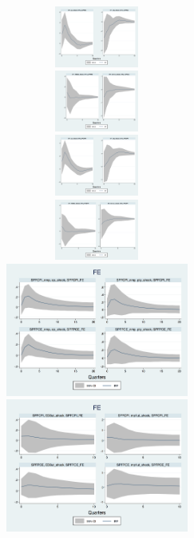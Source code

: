 \documentclass[]{article}
\begin{document}
\begin{figure}[h]\label{ReplicateCoibionpost2007}
	\centering
	\includegraphics[width=6cm,height=2cm]{figures/CPIAU_ashocks_nmp_post2007.png}  
	\includegraphics[width=6cm,height=2cm]{figures/CPIAU_ashocks_post2007.png} \\
	\includegraphics[width=6cm,height=2cm]{figures/PCEPI_ashocks_nmp_post2007.png} 
	\includegraphics[width=6cm,height=2cm]{figures/PCEPI_ashocks_post2007.png}  \\
	\smallskip
	\includegraphics[width=6cm]{figures/SPFFE_ashocks_nmp_post2007.png} 
	\includegraphics[width=6cm]{figures/SPFFE_ashocks_post2007.png} \\

\end{figure}
\end{document}
